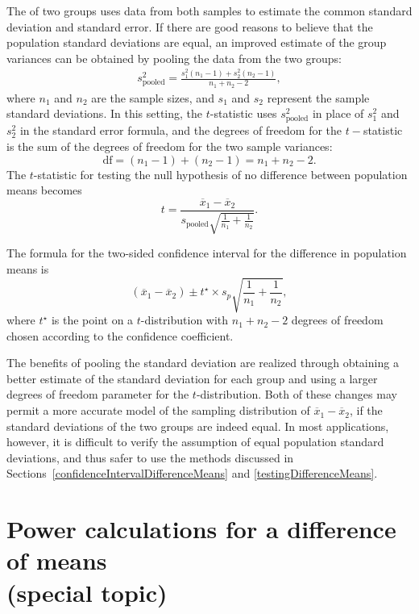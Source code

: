 The  of two groups uses data from both samples to estimate the common standard deviation and standard error. If there are good reasons to believe that the population standard deviations are equal, an improved estimate of the group variances can be obtained by pooling the data from the two groups:
\begin{align*}
s_{\text{pooled}}^2 = \frac{s_1^2 (n_1-1) + s_2^2 (n_2-1)}{n_1 + n_2 - 2},
\end{align*}
where $n_1$ and $n_2$ are the sample sizes, and $s_1$ and $s_2$ represent the sample standard deviations. In this setting, the $t$-statistic uses $s_{\text{pooled}}^2$ in place of $s_1^2$ and $s_2^2$ in the standard error formula, and the degrees of freedom for the $t-$statistic is the sum of the degrees of freedom for the two sample variances:
\[
\text{df} = (n_1 - 1) + (n_2 - 1) = n_1 + n_2 - 2.
\]
The $t$-statistic for testing the null hypothesis of no difference between population means becomes 
\[
 t = \frac{\overline{x}_1 - \overline{x}_2}{s_{\text{pooled}}\sqrt{\frac{1}{n_1} + \frac{1}{n_2}}}. 
\]

The formula for the two-sided confidence interval for the difference in population means is
\[
(\overline{x}_1 - \overline{x}_2) \pm t^{\star} \times s_p \sqrt{\frac{1}{n_1} + \frac{1}{n_2}},
\]
where $t^{\star}$ is the point on a $t$-distribution with $n_1 + n_2 -2$ degrees of freedom chosen according to the confidence coefficient.

The benefits of pooling the standard deviation are realized through obtaining a better estimate of the standard deviation for each group and using a larger degrees of freedom parameter for the $t$-distribution. Both of these changes may permit a more accurate model of the sampling distribution of $\overline{x}_1 - \overline{x}_2$, if the standard deviations of the two groups are indeed equal.  In most applications, however, it is difficult to verify the assumption of equal population standard deviations, and thus safer to use the methods discussed in Sections~\ref{confidenceIntervalDifferenceMeans} and \ref{testingDifferenceMeans}.

\section[Power calculations for a difference of means (special topic)]{Power calculations for a difference of means\\ (special topic)}
\label{PowerForDifferenceOfTwoMeans}

